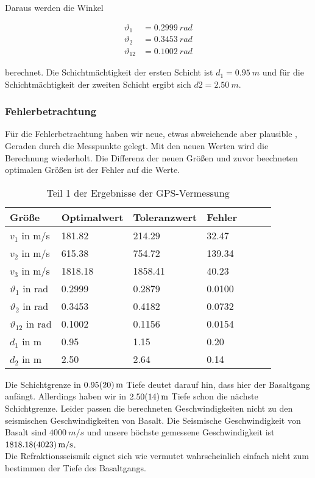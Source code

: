 Daraus werden die Winkel 

\begin{align}
 \vartheta_1 &= \SI{0.2999}{rad} \\
 \vartheta_2 &= \SI{0.3453}{rad} \\
 \vartheta_12 &= \SI{0.1002}{rad}
\end{align}

berechnet.
Die Schichtmächtigkeit der ersten Schicht ist $d_1 =\SI{0.95}{m}$ und für die Schichtmächtigkeit der zweiten Schicht ergibt sich $d2 = \SI{2.50}{m}$.\\

\subsubsection{Fehlerbetrachtung}

Für die Fehlerbetrachtung haben wir neue, etwas abweichende aber plausible , Geraden durch die Messpunkte gelegt. Mit den neuen Werten wird die Berechnung wiederholt. Die Differenz der neuen Größen und zuvor beechneten optimalen Größen ist der Fehler auf die Werte.


\begin{table}[!ht]
\centering
\caption{Teil 1 der Ergebnisse der GPS-Vermessung}
\label{tab:gps1}
\begin{tabular}{lllllll}
\toprule
Größe   & Optimalwert   & Toleranzwert   & Fehler \\
\midrule
$v_1$ in m/s & 181.82 & 214.29 & 32.47 \\
$v_2$ in m/s & 615.38 & 754.72 & 139.34 \\
$v_3$ in m/s & 1818.18 & 1858.41 & 40.23 \\
$\vartheta_1$ in rad & 0.2999 & 0.2879 & 0.0100 \\
$\vartheta_2$ in rad & 0.3453 & 0.4182 & 0.0732 \\
$\vartheta_{12}$ in rad & 0.1002 & 0.1156 & 0.0154 \\
$d_1$ in m & 0.95 & 1.15 & 0.20 \\
$d_2$ in m & 2.50 & 2.64 & 0.14 \\

\bottomrule
\end{tabular}
\end{table}


Die Schichtgrenze in $\SI{0.95 \pm 0.20}{m}$  Tiefe deutet darauf hin, dass hier der Basaltgang anfängt. Allerdings haben wir in $\SI{2.50 \pm 0.14}{m}$ Tiefe schon die nächste Schichtgrenze. Leider passen die berechneten Geschwindigkeiten nicht zu den seismischen Geschwindigkeiten von Basalt. Die Seismische Geschwindigkeit von Basalt sind $\SI{4000}{m/s}$ und unsere höchste gemessene Geschwindigkeit ist $\SI{1818.18 \pm 40.23}{m/s}$.\\
Die Refraktionsseismik eignet sich wie vermutet wahrscheinlich einfach nicht zum bestimmen der Tiefe des Basaltgangs. 


